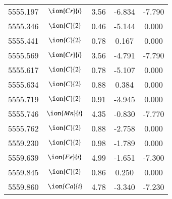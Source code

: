 \documentclass[fleqn,usenatbib]{mnras}
\begin{document}
\begin{center}
\begin{table}
\begin{tabular}{ccccc}
5555.197 &  $\ion{Cr}{i}$  & 3.56 & -6.834 & -7.790 \\ 
5555.346 &  $\ion{C}{2}$ & 0.46 & -5.144 & 0.000 \\ 
5555.441 &  $\ion{C}{2}$ & 0.78 & 0.167 & 0.000 \\ 
5555.569 &  $\ion{Cr}{i}$  & 3.56 & -4.791 & -7.790 \\ 
5555.617 &  $\ion{C}{2}$ & 0.78 & -5.107 & 0.000 \\ 
5555.634 &  $\ion{C}{2}$ & 0.88 & 0.384 & 0.000 \\ 
5555.719 &  $\ion{C}{2}$ & 0.91 & -3.945 & 0.000 \\ 
5555.746 &  $\ion{Mn}{i}$  & 4.35 & -0.830 & -7.770 \\ 
5555.762 &  $\ion{C}{2}$ & 0.88 & -2.758 & 0.000 \\ 
5559.230 &  $\ion{C}{2}$ & 0.98 & -1.789 & 0.000 \\ 
5559.639 &  $\ion{Fe}{i}$  & 4.99 & -1.651 & -7.300 \\ 
5559.845 &  $\ion{C}{2}$ & 0.86 & 0.250 & 0.000 \\ 
5559.860 &  $\ion{Ca}{i}$  & 4.78 & -3.340 & -7.230 \\ 
 \end{tabular}
 \end{table}
 \end{center}
\end{document}
